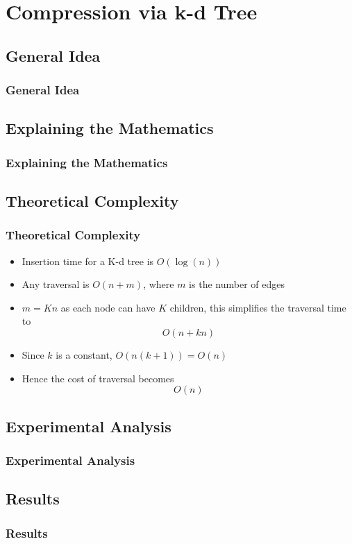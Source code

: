\documentclass[aspectratio=169]{beamer}
\begin{document}

\section{Compression via k-d Tree}
\subsection{General Idea}
\begin{frame}
  \frametitle{General Idea}
\end{frame}
\subsection{Explaining the Mathematics}
\begin{frame}
  \frametitle{Explaining the Mathematics}
\end{frame}
\subsection{Theoretical Complexity}
\begin{frame}
  \frametitle{Theoretical Complexity}
\begin{itemize}
\item Insertion time for a K-d tree is $O (\log(n))$
\item Any traversal is $O(n+m)$, where $m$ is the number of edges
\item $m = K n$ as each node can have $K$ children, this simplifies the traversal time to 
$$O(n+kn)$$
\item Since $k$ is a constant, $O(n(k+1)) = O(n)$
\item Hence the cost of traversal becomes $$O(n)$$
    
\end{itemize}
\end{frame}
\subsection{Experimental Analysis}
\begin{frame}
  \frametitle{Experimental Analysis}
\end{frame}
\subsection{Results}
\begin{frame}
  \frametitle{Results}
\end{frame}
\end{document}
